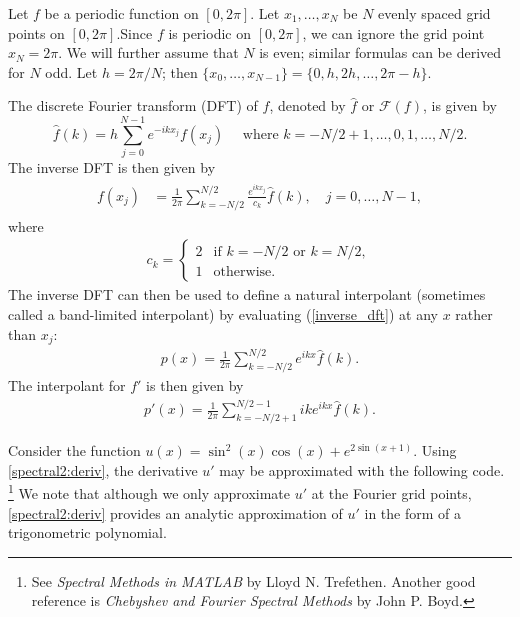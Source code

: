 \label{lab:pseudospectral2}


Let $f$ be a periodic function on $[0,2\pi]$.
Let $x_1,\ldots,x_N$ be $N$ evenly spaced grid points on $[0,2\pi].
$Since $f$ is periodic on $[0,2\pi]$, we can ignore the grid point $x_N = 2\pi$.
We will further assume that $N$ is even; similar formulas can be derived for $N$ odd.
Let $h = 2\pi/N$; then $\{x_0,\ldots,x_{N-1}\} = \{0,h,2h,\ldots,2\pi-h\}$.  

The discrete Fourier transform (DFT) of $f$, denoted by $\hat{f}$ or $\mathcal{F}(f)$, is given by
\[
\hat{f}(k) = h \sum_{j=0}^{N-1} e^{-ikx_j}f(x_j) \quad \text{ where } k = -N/2+1, \ldots,0,1,\ldots, N/2.
\]
The inverse DFT is then given by
\begin{align}
\begin{split}
f(x_j) &= \frac{1}{2\pi}\sum_{k=-N/2}^{N/2}\frac{e^{ikx_j}}{c_k}\hat{f}(k), \quad j = 0,\ldots, N-1,
\end{split}\label{inverse_dft}
\end{align}
where
\begin{align}
	c_k = \begin{cases} 2 & \text{if }k = -N/2 \text{ or }k = N/2, \\ 1 &  \text{otherwise.}
\end{cases}
\end{align}
The inverse DFT can then be used to define a natural interpolant (sometimes called a band-limited interpolant) by evaluating (\ref{inverse_dft}) at any $x$ rather than $x_j$:
\begin{align}
p(x) = \frac{1}{2\pi}\sum_{k=-N/2}^{N/2} e^{ikx}\hat{f}(k). \label{interpolant}
\end{align}
The interpolant for $f'$ is then given by 
\begin{align}
p'(x) = \frac{1}{2\pi}\sum_{k=-N/2+1}^{N/2-1} ike^{ikx}\hat{f}(k). \label{spectral2:deriv}
\end{align}

Consider the function $u(x) = \sin^2 (x) \cos(x) +e^{2\sin(x+1)}$. 
Using \eqref{spectral2:deriv}, the derivative $u'$ may be approximated with the following code. 
\footnote{See \textit{Spectral Methods in MATLAB} by Lloyd N. Trefethen.
Another good reference is \textit{Chebyshev and Fourier Spectral Methods} by John P. Boyd.}
We note that although we only approximate $u'$ at the Fourier grid points, \eqref{spectral2:deriv} provides an analytic approximation of $u'$ in the form of a trigonometric polynomial.

